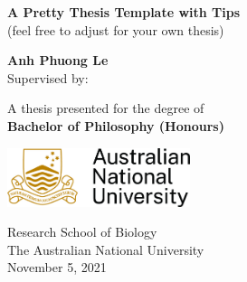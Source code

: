 \begin{titlepage}
    \begin{center}
        \vspace*{1cm}
        \Huge
        \textbf{A Pretty Thesis Template with Tips} \\
        (feel free to adjust for your own thesis) \\
        \LARGE
        \vspace{3cm}
            
        \textbf{Anh Phuong Le} \\
        \normalsize
        \vspace{1cm}
        Supervised by:  
            
        \vfill
        
        \large   
        A thesis presented for the degree of\\
        \textbf{Bachelor of Philosophy (Honours)}  \\
            
        \vspace{0.8cm}
            
        \includegraphics[width=0.4\textwidth]{graphics/ANU_Primary_Horizontal_GoldBlack.jpg} 
            
        \Large
        Research School of Biology\\
        The Australian National University\\
        November 5, 2021 \\
        
            
    \end{center}
\end{titlepage}